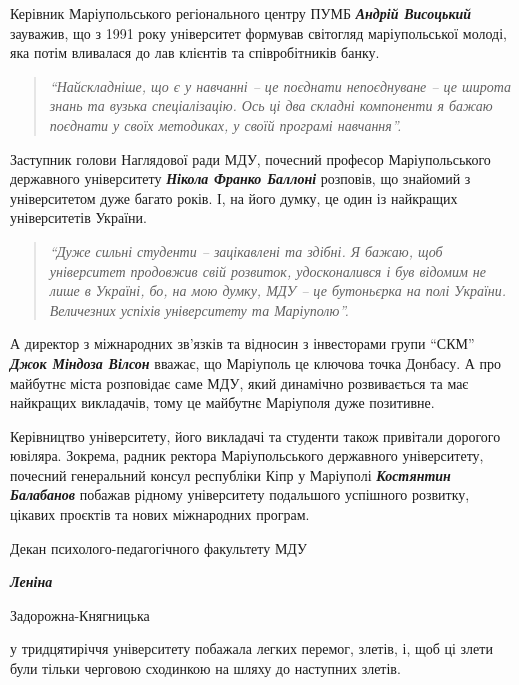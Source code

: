 Керівник Маріупольського регіонального центру ПУМБ \emph{\textbf{Андрій
Висоцький}} зауважив, що з 1991 року університет формував світогляд
маріупольської молоді, яка потім вливалася до лав клієнтів та співробітників
банку.

\begin{quote}
\em\enquote{Найскладніше, що є у
навчанні – це поєднати непоєднуване – це широта знань та вузька спеціалізацію.
Ось ці два складні компоненти я бажаю поєднати у своїх методиках, у своїй
програмі навчання}.
\end{quote}


Заступник голови Наглядової ради МДУ, почесний професор Маріупольського
державного університету \emph{\textbf{Нікола Франко Баллоні}} розповів, що знайомий з
університетом дуже багато років. І, на його думку, це один із найкращих
університетів України. 

\begin{quote}
\em\enquote{Дуже сильні студенти – зацікавлені та здібні. Я бажаю,
щоб університет продовжив свій розвиток, удосконалився і був відомим не лише в
Україні, бо, на мою думку, МДУ – це бутоньєрка на полі України. Величезних
успіхів університету та Маріуполю}.
\end{quote}

А директор з міжнародних зв'язків та відносин з інвесторами групи \enquote{СКМ} \emph{\textbf{Джок
Міндоза Вілсон}} вважає, що Маріуполь це ключова точка Донбасу. А про майбутнє
міста розповідає саме МДУ, який динамічно розвивається та має найкращих
викладачів, тому це майбутнє Маріуполя дуже позитивне.

Керівництво університету, його викладачі та студенти також привітали дорогого
ювіляра. Зокрема, радник ректора Маріупольського державного університету,
почесний генеральний консул республіки Кіпр у Маріуполі \emph{\textbf{Костянтин Балабанов}}
побажав рідному університету подальшого успішного розвитку, цікавих проєктів та
нових міжнародних програм.


Декан психолого-педагогічного факультету МДУ {\em\bfseries Леніна\par\noindent Задорожна-Княгницька} у
тридцятиріччя університету побажала легких перемог, злетів, і, щоб ці злети
були тільки черговою сходинкою на шляху до наступних злетів.

